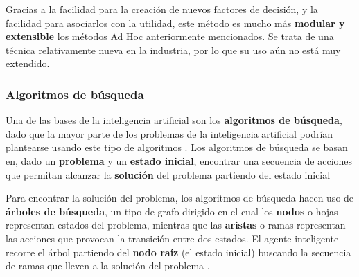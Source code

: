Gracias a la facilidad para la creación de nuevos factores de decisión, y la facilidad para asociarlos con la utilidad, este método es mucho más \textbf{modular y extensible} los métodos Ad Hoc anteriormente mencionados. Se trata de una técnica relativamente nueva en la industria, por lo que su uso aún no está muy extendido.

\subsubsection{Algoritmos de búsqueda}
Una de las bases de la inteligencia artificial son los \textbf{algoritmos de búsqueda}, dado que la mayor parte de los problemas de la inteligencia artificial podrían plantearse usando este tipo de algoritmos \cite{ai_and_games}. Los algoritmos de búsqueda se basan en, dado un \textbf{problema} y un \textbf{estado inicial}, encontrar una secuencia de acciones que permitan alcanzar la \textbf{solución} del problema partiendo del estado inicial

Para encontrar la solución del problema, los algoritmos de búsqueda hacen uso de \textbf{árboles de búsqueda}, un tipo de grafo dirigido en el cual los \textbf{nodos} o hojas representan estados del problema, mientras que las \textbf{aristas} o ramas representan las acciones que provocan la transición entre dos estados. El agente inteligente recorre el árbol partiendo del \textbf{nodo raíz} (el estado inicial) buscando la secuencia de ramas que lleven a la solución del problema \cite{ia_moderno}. 

